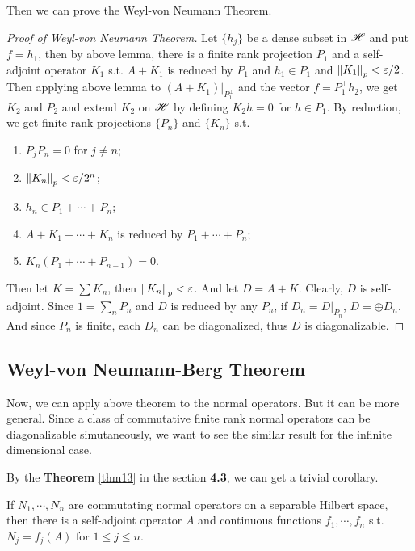 \documentclass[a4paper,11pt]{report}
\begin{document}
Then we can prove the Weyl-von Neumann Theorem.

\begin{proof}[Proof of Weyl-von Neumann Theorem]
	Let $\{h_j\}$ be a dense subset in $\mathscr{H}$ and put $f = h_1$, then by above lemma, there is a finite rank projection $P_1$ and a self-adjoint operator $K_1$ s.t. $A+K_1$ is reduced by $P_1$ and $h_1 \in P_1$ and $\left\lVert K_1\right\lVert_p < \varepsilon / 2$. Then applying above lemma to $(A+K_1)|_{P_1^{\bot}}$ and the vector $f = P_1^{\bot} h_2$, we get $K_2$ and $P_2$ and extend $K_2$ on $\mathscr{H}$ by defining $K_2 h =0$ for $h \in P_1$. By reduction, we get finite rank projections $\{P_n\}$ and $\{K_n\}$ s.t.
	\begin{enumerate}[label = \arabic*)]
		\item $P_j P_n = 0$ for $j \neq n$;
		\item $\left\lVert K_n\right\lVert_p < \varepsilon / 2^n$;
		\item $h_n \in P_1 + \cdots + P_n$;
		\item $A+K_1+\cdots+K_n$ is reduced by $P_1 + \cdots + P_n$;
		\item $K_n(P_1 + \cdots + P_{n-1}) = 0$.
	\end{enumerate}
	Then let $K = \sum K_n$, then $\left\lVert K_n\right\lVert_p < \varepsilon$. And let $D = A + K$. Clearly, $D$ is self-adjoint. Since $1 = \sum_n P_n$ and $D$ is reduced by any $P_n$, if $D_n = D|_{P_n}$, $D = \oplus D_n$. And since $P_n$ is finite, each $D_n$ can be diagonalized, thus $D$ is diagonalizable.
\end{proof}

\subsection{Weyl-von Neumann-Berg Theorem}

Now, we can apply above theorem to the normal operators. But it can be more general. Since a class of commutative finite rank normal operators can be diagonalizable simutaneously, we want to see the similar result for the infinite dimensional case.

By the \textbf{Theorem} \ref{thm13} in the section \textbf{4.3}, we can get a trivial corollary.

\begin{cor}
	If $N_1, \cdots, N_n$ are commutating normal operators on a separable Hilbert space, then there is a self-adjoint operator $A$ and continuous functions $f_1,\cdots,f_n$ s.t. $N_j = f_j(A)$ for $1 \leqslant j \leqslant n$.
\end{cor}
\end{document}
